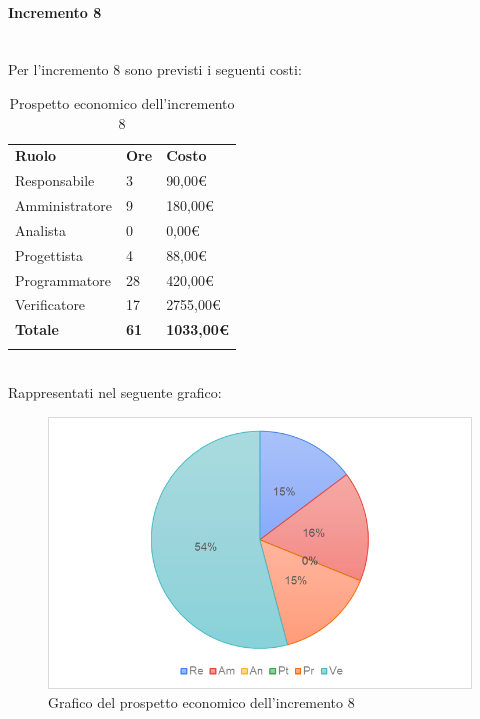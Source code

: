 \paragraph{Incremento 8} \mbox{} \\
Per l'incremento 8 sono previsti i seguenti costi:
\begin{longtable} {
		>{}p{32mm}
		>{}p{20mm}
		>{}p{20mm}
	}
	\rowcolor{gray!50}
	
	\textbf{Ruolo} & \textbf{Ore} & \textbf{Costo} \TBstrut \\
	Responsabile & 3 & 90,00\euro{} \TBstrut \\
	Amministratore & 9 & 180,00\euro{} \TBstrut \\
	Analista & 0 & 0,00\euro{} \TBstrut \\
	Progettista & 4 & 88,00\euro{}\TBstrut \\
	Programmatore & 28 & 420,00\euro{} \TBstrut \\
	Verificatore & 17 & 2755,00\euro{} \TBstrut \\
	\textbf{Totale} & \textbf{61}& \textbf{1033,00\euro{}} \TBstrut \\	
	\rowcolor{white}
	\caption{Prospetto economico dell'incremento 8}
\end{longtable} \mbox{} \\
Rappresentati nel seguente grafico: \mbox{}
\begin{figure} [H]
	\includegraphics[width=\linewidth]{./img/Grafici/ra4.png}
	\caption{Grafico del prospetto economico dell'incremento 8}
\end{figure}

